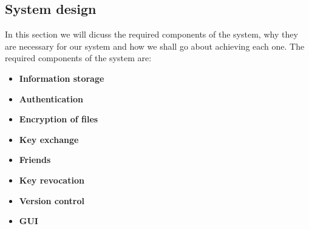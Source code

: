 \documentclass[12pt, titlepage]{article}
\begin{document}
\subsection{System design}
In this section we will dicuss the required components of the system, why they are necessary for our system and how we shall go about achieving each one. The required components of the system are:
\begin{itemize}
	\item \textbf{Information storage}
	\item \textbf{Authentication}
	\item \textbf{Encryption of files}
	\item \textbf{Key exchange}
	\item \textbf{Friends}
	\item \textbf{Key revocation}
	\item \textbf{Version control}
	\item \textbf{GUI}
\end{itemize}
\end{document}
